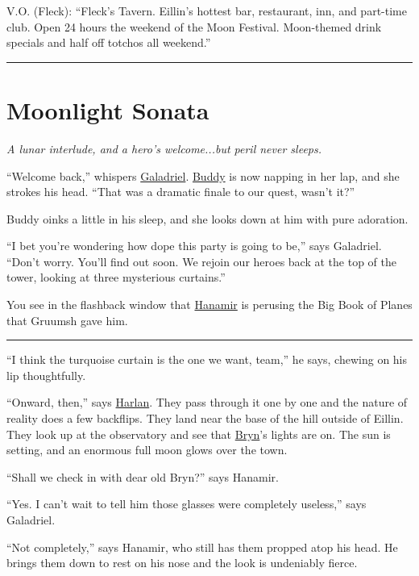\documentclass[smalldemyvopaper,11pt,twoside,onecolumn,openright,extrafontsizes]{memoir}
\newcommand{\chapdesc}[1]{
    \begin{flushright}
    \emph{{#1}}
    \end{flushright}
    \vspace{26pt}
}
\begin{document}
V.O. (Fleck): ``Fleck's Tavern. Eillin's hottest bar, restaurant, inn,
and part-time club. Open 24 hours the weekend of the Moon Festival.
Moon-themed drink specials and half off totchos all weekend.''

\begin{center}\rule{0.5\linewidth}{\linethickness}\end{center}


\chapter{Moonlight Sonata}
\chapdesc{A lunar interlude, and a hero's welcome...but peril never sleeps.}

``Welcome back,'' whispers \href{/characters/galadriel/}{Galadriel}.
\href{/characters/buddy/}{Buddy} is now napping in her lap, and she
strokes his head. ``That was a dramatic finale to our quest, wasn't
it?''

Buddy oinks a little in his sleep, and she looks down at him with pure
adoration.

``I bet you're wondering how dope this party is going to be,'' says
Galadriel. ``Don't worry. You'll find out soon. We rejoin our heroes
back at the top of the tower, looking at three mysterious curtains.''

You see in the flashback window that
\href{/characters/hanamir/}{Hanamir} is perusing the Big Book of Planes
that Gruumsh gave him.

\begin{center}\rule{0.5\linewidth}{\linethickness}\end{center}

``I think the turquoise curtain is the one we want, team,'' he says,
chewing on his lip thoughtfully.

``Onward, then,'' says \href{/characters/harlan/}{Harlan}. They pass
through it one by one and the nature of reality does a few backflips.
They land near the base of the hill outside of Eillin. They look up at
the observatory and see that \href{/characters/bryn/}{Bryn}'s lights are
on. The sun is setting, and an enormous full moon glows over the town.

``Shall we check in with dear old Bryn?'' says Hanamir.

``Yes. I can't wait to tell him those glasses were completely useless,''
says Galadriel.

``Not completely,'' says Hanamir, who still has them propped atop his
head. He brings them down to rest on his nose and the look is undeniably
fierce.
\end{document}
